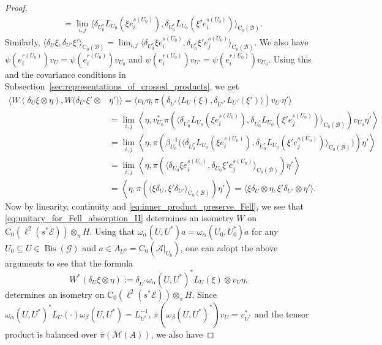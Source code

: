 \documentclass[11 pt, leqno]{amsart}
\numberwithin{equation}{section}
\theoremstyle{plain}
\theoremstyle{definition}
\newcommand*{\contz}{\mathrm{C_0}}%
\DeclareMathOperator{\Bis}{Bis}
\newcommand{\B}{\mathcal B}
\newcommand{\M}{\mathcal M}
\newcommand{\G}{\mathcal G} %
\newcommand{\EE}{\mathcal E}
\newcommand{\A}{\mathcal A}
\begin{document}
\begin{proof}
\[\begin{split}
        &= \lim_{i,j} \langle \delta_{U_0^*} L_{U_0}(\xi e_{i}^{s(U_0)}) ,  \delta_{U_0^*}L_{U_0}(\xi' e_{i}^{s(U_0)})\rangle_{\contz(\B)}.
\end{split}
\]
Similarly, $\langle \delta_{U}\xi , \delta_{U'}\xi' \rangle_{\contz(\B)} = \lim_{i,j} \langle \delta_{U_0^*}\xi e_{i}^{s(U_0)}, \delta_{U_0^*}\xi' e_{j}^{s(U_0)} \rangle_{\contz(\B)}$. 
We also have $\psi(e_i^{r(U_0)})v_{U} = \psi(e_i^{r(U_0)})v_{U_0}$ and $\psi(e_i^{r(U_0)})v_{U'}=\psi(e_i^{r(U_0)})v_{U_0}$.
Using this and the covariance conditions in Subsection~\ref{sec:representations_of_crossed_products}, we get 
\[
\begin{split}
    \langle W (\delta_U\xi \otimes \eta),  W (\delta_{U'}\xi' \otimes & \eta')\rangle = \langle  v_U\eta,\pi(\delta_{U^*}\langle L_{U}(\xi) ,\delta_{U'^*} L_{U'}(\xi') \rangle) v_{U'}\eta' \rangle \\
        &= \lim_{i,j} \left\langle \eta, v_{U_0}^*\pi\left(\langle \delta_{U_0^*} L_{U_0}(\xi e_{i}^{s(U_0)}) ,  \delta_{U_0^*} L_{U_0}(\xi' e_{j}^{s(U_0)}) \rangle_{\contz(\B)} \right)v_{U_0} \eta' \right\rangle \\
        &= \lim_{i,j} \left\langle \eta , \pi \left( \beta_{U_0}^{-1} \Big( \langle\delta_{U_0^*} L_{U_0}(\xi e_{i}^{s(U_0)}) , \delta_{U_0^*} L_{U_0}(\xi' e_{j}^{s(U_0)}) \rangle_{\contz(\B)}\Big)\right)\eta' \right\rangle \\
        &= \lim_{i,j} \left\langle \eta, \pi\left(\langle \delta_{U_0} \xi e_{i}^{s(U_0)}, \delta_{U_0} \xi' e_{j}^{s(U_0)} \rangle_{\contz(\B)}\right)\eta'\right\rangle \\
        &= \left\langle \eta, \pi\left(\langle \xi \delta_{U}, \xi' \delta_{U'} \rangle_{\contz(\B)}\right)\eta'\right\rangle = \langle \xi \delta_U\otimes \eta,  \xi' \delta_{U'}\otimes \eta'\rangle.
\end{split}
\]
Now by linearity, continuity and \eqref{eq:inner_product_preserve_Fell}, we see that \eqref{eq:unitary_for_Fell_absorption_II} determines an isometry $W$ on $\contz(\ell^2(s^*\EE))\otimes_{\pi} H$. 
Using that $\omega_{\alpha}(U,U^*)a=\omega_{\alpha}(U_0,U_0^*)a$ for any $U_0\subseteq U\in \Bis(\G)$ and $a\in A_{U^0}=\contz(\A|_{U_0})$, one can adopt the above arguments to see that the formula
\[
    W^* (\delta_U\xi \otimes \eta) := \delta_{U^*}\omega_{\alpha}(U,U^*)^*L_{U}(\xi) \otimes v_{U}\eta,
\]
determines an isometry on $\contz(\ell^2(s^*\EE))\otimes_{\pi} H$. 
Since $\omega_{\alpha}(U,U^*)^*L_{U}(\cdot)\omega_{\beta}(U,U^*) = L_{U^*}^{-1}$, $\overline{\pi}(\omega_{\beta}(U,U^*)^*)v_{U}=v_{U^*}^*$ and the tensor product is balanced over $\overline{\pi}(\M(A))$, we also have

\end{proof}
\end{document}

